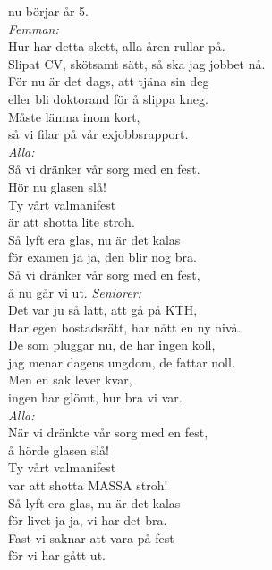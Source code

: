 \documentclass[a6paper, 10pt, twoside]{article}
\begin{document}
\begin{lyrics}
nu börjar år 5.
\vspace{5pt} \\
\textit{Femman:} \\
Hur har detta skett, alla åren rullar på. \\
Slipat CV, skötsamt sätt, så ska jag jobbet nå. \\
För nu är det dags, att tjäna sin deg \\
eller bli doktorand för å slippa kneg. \\
Måste lämna inom kort,  \\
så vi filar på vår exjobbsrapport.
\vspace{5pt} \\
\textit{Alla:} \\
Så vi dränker vår sorg med en fest. \\
Hör nu glasen slå! \\
Ty vårt valmanifest \\
är att shotta lite stroh. \\
Så lyft era glas, nu är det kalas \\
för examen ja ja, den blir nog bra. \\
Så vi dränker vår sorg med en fest, \\
å nu går vi ut.
\newpage
\noindent
\textit{Seniorer:} \\
Det var ju så lätt, att gå på KTH, \\
Har egen bostadsrätt, har nått en ny nivå. \\
De som pluggar nu, de har ingen koll, \\
jag menar dagens ungdom, de fattar noll. \\
Men en sak lever kvar,  \\
ingen har glömt, hur bra vi var.
\vspace{5pt} \\
\textit{Alla:} \\
När vi dränkte vår sorg med en fest, \\
å hörde glasen slå! \\
Ty vårt valmanifest \\
var att shotta MASSA stroh! \\
Så lyft era glas, nu är det kalas \\
för livet ja ja, vi har det bra. \\
Fast vi saknar att vara på fest \\
för vi har gått ut.
\end{lyrics}
\end{document}
